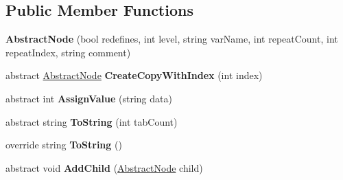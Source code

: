\subsection*{Public Member Functions}
\begin{DoxyCompactItemize}
\item 
{\bfseries Abstract\+Node} (bool redefines, int level, string var\+Name, int repeat\+Count, int repeat\+Index, string comment)\hypertarget{class__1920_parser_1_1_abstract_node_aebc3c9efb2855add3285f717edd5ca86}{}\label{class__1920_parser_1_1_abstract_node_aebc3c9efb2855add3285f717edd5ca86}

\item 
abstract \hyperlink{class__1920_parser_1_1_abstract_node}{Abstract\+Node} {\bfseries Create\+Copy\+With\+Index} (int index)\hypertarget{class__1920_parser_1_1_abstract_node_a636ae975a7e037fb31c4d4341e222c1b}{}\label{class__1920_parser_1_1_abstract_node_a636ae975a7e037fb31c4d4341e222c1b}

\item 
abstract int {\bfseries Assign\+Value} (string data)\hypertarget{class__1920_parser_1_1_abstract_node_a457498d3ec29d4c2af707aad2cf3bfc9}{}\label{class__1920_parser_1_1_abstract_node_a457498d3ec29d4c2af707aad2cf3bfc9}

\item 
abstract string {\bfseries To\+String} (int tab\+Count)\hypertarget{class__1920_parser_1_1_abstract_node_ae41877e0bad1b9ed1e4b5ae8c01bca60}{}\label{class__1920_parser_1_1_abstract_node_ae41877e0bad1b9ed1e4b5ae8c01bca60}

\item 
override string {\bfseries To\+String} ()\hypertarget{class__1920_parser_1_1_abstract_node_a2fef1588cfaa3d7979c8fd3af77d08d3}{}\label{class__1920_parser_1_1_abstract_node_a2fef1588cfaa3d7979c8fd3af77d08d3}

\item 
abstract void {\bfseries Add\+Child} (\hyperlink{class__1920_parser_1_1_abstract_node}{Abstract\+Node} child)\hypertarget{class__1920_parser_1_1_abstract_node_af6241531937bb83d55aea81268b97f0b}{}\label{class__1920_parser_1_1_abstract_node_af6241531937bb83d55aea81268b97f0b}

\end{DoxyCompactItemize}
